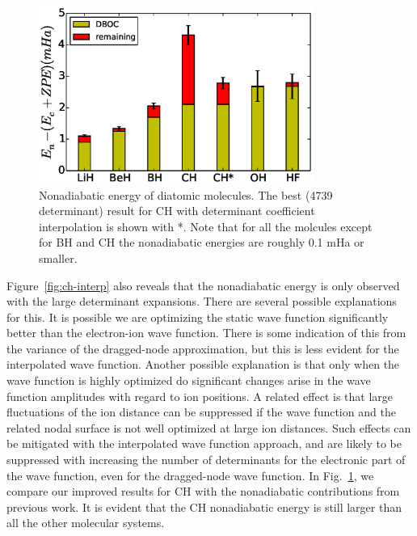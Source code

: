 \begin{figure}[h]
\includegraphics[width=0.8\textwidth]{4738}
\caption{Nonadiabatic energy of diatomic molecules. The best (4739
determinant) result for CH with determinant coefficient interpolation is shown
with *. Note that for all the molcules except for BH and CH the nonadiabatic
energies are roughly 0.1 mHa or smaller.}
\label{fig:nonbo-ch-star}
\end{figure}

Figure~\ref{fig:ch-interp} also reveals that the nonadiabatic energy is only observed with the
large determinant expansions. There are several possible explanations for this. It
is possible we are optimizing the static wave function significantly better than the
electron-ion wave function. There is some indication of this from the variance
of the dragged-node approximation, but this is less evident for the interpolated
wave function. Another possible explanation is that only when the wave function
is highly optimized do significant changes arise in the wave function amplitudes
with regard to ion positions. A related effect is that large fluctuations of the ion
distance can be suppressed if the wave function and the related nodal surface is
not well optimized at large ion distances. Such effects can be mitigated
with the interpolated wave function approach, and are likely to be suppressed with
increasing the number of determinants for the electronic part of the wave function,
even for the dragged-node wave function. In Fig.~\ref{fig:nonbo-ch-star}, we compare our improved results
for CH with the nonadiabatic contributions from previous work. It is evident
that the CH nonadiabatic energy is still larger than all the other molecular
systems.

